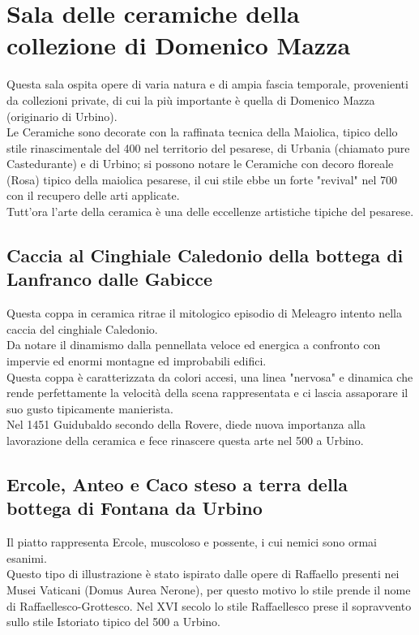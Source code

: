 \documentclass[12pt,a4paper]{article}
\begin{document}
	\section{Sala delle ceramiche della collezione di Domenico Mazza}
	Questa sala ospita opere di varia natura e di ampia fascia temporale, provenienti da collezioni private, di cui la più importante è quella di Domenico Mazza (originario di Urbino).\\ 
	Le Ceramiche sono decorate con la raffinata tecnica della Maiolica, tipico dello stile rinascimentale del 400 nel territorio del pesarese, di Urbania (chiamato pure Castedurante) e di Urbino; si possono notare le Ceramiche con decoro floreale (Rosa) tipico della maiolica pesarese, il cui stile ebbe un forte "revival" nel 700 con il recupero delle arti applicate.\\
	Tutt'ora l'arte della ceramica è una delle eccellenze artistiche tipiche del pesarese.
	
	\subsection{Caccia al Cinghiale Caledonio della bottega di Lanfranco dalle Gabicce}
	Questa coppa in ceramica ritrae il mitologico episodio di Meleagro intento nella caccia del cinghiale Caledonio.\\
	Da notare il dinamismo dalla pennellata veloce ed energica a confronto con impervie ed enormi montagne ed improbabili edifici.\\
	Questa coppa è caratterizzata da colori accesi, una linea "nervosa" e dinamica che rende perfettamente la velocità della scena rappresentata e ci lascia assaporare il suo gusto tipicamente manierista.\\
	Nel 1451 Guidubaldo secondo della Rovere, diede nuova importanza alla lavorazione della ceramica e fece rinascere questa arte nel 500 a Urbino.
	
	\subsection{Ercole, Anteo e Caco steso a terra della bottega di Fontana da Urbino}
	Il piatto rappresenta Ercole, muscoloso e possente, i cui nemici sono ormai esanimi.\\ 
	Questo tipo di illustrazione è stato ispirato dalle opere di Raffaello presenti nei Musei Vaticani (Domus Aurea Nerone), per questo motivo lo stile prende il nome di Raffaellesco-Grottesco. Nel XVI secolo lo stile Raffaellesco prese il sopravvento sullo stile Istoriato tipico del 500 a Urbino.
	
\end{document}
